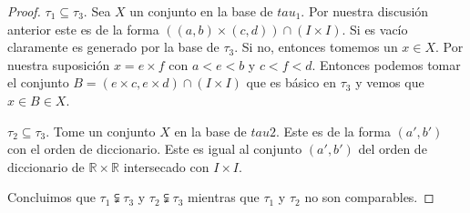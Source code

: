 \documentclass[letter,twoside,11pt]{article}
\begin{document}
\begin{enumerate}
\begin{proof}
$\tau_1 \subseteq \tau_3$. Sea $X$ un conjunto en la base de $tau_1$. Por nuestra discusi\'on anterior este es de la forma $((a,b) \times (c,d)) \cap (I \times I)$. Si es vac\'io claramente es generado por la base de $\tau_3$. Si no, entonces tomemos un $x \in X$. Por nuestra suposici\'on $x=e \times f$ con $a<e<b$ y $c<f<d$. Entonces podemos tomar el conjunto $B=(e \times c, e \times d) \cap (I \times I)$ que es b\'asico en $\tau_3$ y vemos que $x \in B \in X$.   


$\tau_2 \subseteq \tau_3$. Tome un conjunto $X$ en la base de $tau 2$. Este es de la forma $(a',b')$ con el orden de diccionario. Este es igual al conjunto $(a',b')$ del orden de diccionario de $\mathbb{R} \times \mathbb{R}$ intersecado con $I \times I$.

Concluimos que $\tau_1 \subsetneqq \tau_3$ y $\tau_2 \subsetneqq \tau_3$ mientras que $\tau_1$ y $\tau_2$ no son comparables.
\end{proof}
\end{enumerate}
\end{document}
